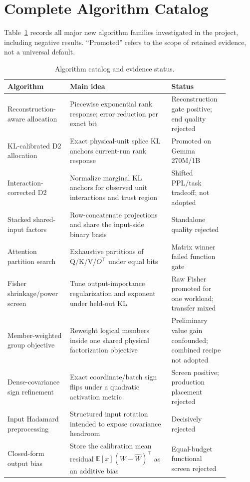 \documentclass[10pt]{article}
\begin{document}
\appendix

\section{Complete Algorithm Catalog}

Table~\ref{tab:catalog} records all major new algorithm families investigated
in the project, including negative results. ``Promoted'' refers to the scope
of retained evidence, not a universal default.

\begin{table}[h]
\centering
\caption{Algorithm catalog and evidence status.}
\label{tab:catalog}
\scriptsize
\begin{tabular}{p{0.24\linewidth}p{0.42\linewidth}p{0.22\linewidth}}
\toprule
Algorithm & Main idea & Status \\
\midrule
Reconstruction-aware allocation & Piecewise exponential rank response; error reduction per exact bit & Reconstruction gate positive; end quality rejected \\
KL-calibrated D2 allocation & Exact physical-unit splice KL anchors current-run rank response & Promoted on Gemma 270M/1B \\
Interaction-corrected D2 & Normalize marginal KL anchors for observed unit interactions and trust region & Shifted PPL/task tradeoff; not adopted \\
Stacked shared-input factors & Row-concatenate projections and share the input-side binary basis & Standalone quality rejected \\
Attention partition search & Exhaustive partitions of Q/K/V/$O^\top$ under equal bits & Matrix winner failed function gate \\
Fisher shrinkage/power screen & Tune output-importance regularization and exponent under held-out KL & Raw Fisher promoted for one workload; transfer mixed \\
Member-weighted group objective & Reweight logical members inside one shared physical factorization objective & Preliminary value gain confounded; combined recipe not adopted \\
Dense-covariance sign refinement & Exact coordinate/batch sign flips under a quadratic activation metric & Screen positive; production placement rejected \\
Input Hadamard preprocessing & Structured input rotation intended to expose covariance headroom & Decisively rejected \\
Closed-form output bias & Store the calibration mean residual $\mathbb E[x](W-\widehat W)^\top$ as an additive bias & Equal-budget functional screen rejected \\

\end{tabular}
\end{table}
\end{document}
